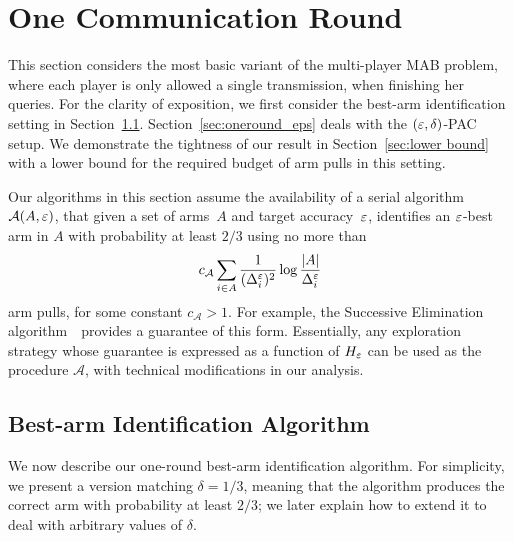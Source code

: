\documentclass{article} %
\newcommand{\Dele}{\Del^{\eps}}
\newcommand{\cA}{c_\mathcal{A}}
\begin{document}
%
\section{One Communication Round}
\label{sec:singleround}



This section considers the most basic variant of the multi-player MAB problem, where each player is only allowed a single transmission, when finishing her queries.
For the clarity of exposition, we first consider the best-arm identification setting in Section~\ref{sec:best one round}.
Section~\ref{sec:oneround_eps} deals with the $(\varepsilon,\delta)$-PAC setup.
We demonstrate the tightness of our result in Section~\ref{sec:lower bound} with a lower bound for the required budget of arm pulls in this setting.  

Our algorithms in this section assume the availability of a serial algorithm $\mathcal{A}(A, \varepsilon)$, that given a set of arms~$A$ and target accuracy~$\varepsilon$, identifies an $\varepsilon$-best arm in $A$ with probability at least $2/3$ using no more than
\begin{align} \label{eq:se-bound}
		\cA \sum_{i \in A} \frac{1}{(\Dele_i)^2} \log \frac{|A|}{\Dele_i}
\end{align}
arm pulls, for some constant $\cA > 1$.
For example, the Successive Elimination algorithm~\cite{evendar06}~provides a guarantee of this form.
Essentially, any exploration strategy whose guarantee is expressed as a function of $H_\varepsilon$ can be used as the procedure $\mathcal{A}$, with technical modifications in our analysis.


\subsection{Best-arm Identification Algorithm} \label{sec:best one round}

We now describe our one-round best-arm identification algorithm. 
For simplicity, we present a version matching $\delta=1/3$, meaning that the algorithm produces the correct arm with probability at least $2/3$; we later explain how to extend it to deal with arbitrary values of $\delta$. 
\end{document}
